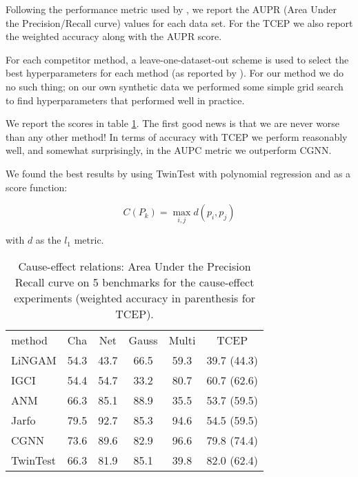 Following the performance metric used by \cite{goudet2017causal}, we report the AUPR (Area Under the Precision/Recall curve)
values for each data set. For the TCEP we also report the weighted accuracy along with the AUPR score. 

For each  competitor method, a leave-one-dataset-out scheme 
is used to select the best hyperparameters for each method (as reported by \cite{goudet2017causal}). For 
our method we do no such thing; on our own synthetic data we performed some simple grid search to find 
hyperparameters that performed well in practice. 

We report the scores in table \ref{tab:AUPR}. The first good news is that we are never worse than any other 
method! In terms of accuracy with TCEP we perform reasonably well, and somewhat surprisingly, in the  
AUPC metric we outperform CGNN. 

We found the best results by using TwinTest with polynomial regression and as a score function:

$$
    C(P_k) = \operatorname{max}_{i, j} d(p_i, p_j)
$$

with $d$ as the $l_1$ metric. 




\begin{table}[H]
    \centering


    \begin{tabular}{lccccc}
        \hline method & Cha & Net & Gauss & Multi & TCEP \\
        LiNGAM & 54.3 & 43.7 & 66.5 & 59.3 & 39.7 (44.3) \\
        IGCI & 54.4 & 54.7 & 33.2 & 80.7 & 60.7 (62.6) \\
        ANM & 66.3 & 85.1 & 88.9 & 35.5 & 53.7 (59.5) \\
        Jarfo & 79.5 & 92.7 & 85.3 & 94.6 & 54.5 (59.5) \\
        CGNN  & 73.6 & 89.6 & 82.9 & 96.6 & 79.8 (74.4) \\
        \hline TwinTest & 66.3 & 81.9 & 85.1 & 39.8 & 82.0 (62.4) \\
        \hline
    \end{tabular}

    \caption{Cause-effect relations: Area Under the Precision Recall curve
     on 5 benchmarks for the cause-effect experiments (weighted accuracy 
     in parenthesis for TCEP).}   
    \label{tab:AUPR}
\end{table}


